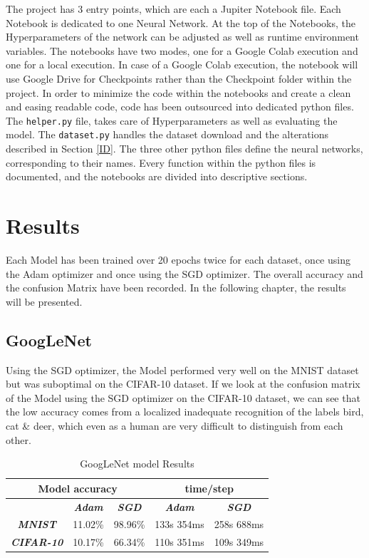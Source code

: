 \documentclass[conference]{IEEEtran}
\begin{document}
The project has 3 entry points, which are each a Jupiter Notebook file. Each Notebook is dedicated to one Neural Network.
At the top of the Notebooks, the Hyperparameters of the network can be adjusted as well as runtime environment variables.
The notebooks have two modes, one for a Google Colab execution and one for a local execution.
In case of a Google Colab execution, the notebook will use Google Drive for Checkpoints rather than the Checkpoint folder within the project.
In order to minimize the code within the notebooks and create a clean and easing readable code, code has been outsourced into dedicated python files.
The \verb|helper.py| file, takes care of Hyperparameters as well as evaluating the model. The \verb|dataset.py| handles the dataset download and the alterations described in Section \ref{ID}.
The three other python files define the neural networks, corresponding to their names. Every function within the python files is documented, and the notebooks are divided into descriptive sections.


\section{Results}
Each Model has been trained over 20 epochs twice for each dataset, once using the Adam optimizer and once using the SGD optimizer. 
The overall accuracy and the confusion Matrix have been recorded. In the following chapter, the results will be presented.

\subsection{GoogLeNet}

Using the SGD optimizer, the Model performed very well on the MNIST dataset but was suboptimal on the CIFAR-10 dataset. 
If we look at the confusion matrix of the Model using the SGD optimizer on the CIFAR-10 dataset, we can see that the low accuracy comes from a localized inadequate recognition of the labels bird, cat \& deer, which even as a human are very difficult to distinguish from each other.

\begin{table}[!htbp]
    \caption{GoogLeNet model Results}
    \begin{center}
    \begin{tabular}{|c|c|c|c|c|}
    \cline{1-5} 
    \multicolumn{3}{|c|}{\textbf{Model accuracy}} & \multicolumn{2}{|c|}{\textbf{time/step}} \\
    \hline 
    \textit{} & \textbf{\textit{Adam}} & \textbf{\textit{SGD}} & \textbf{\textit{Adam}} & \textbf{\textit{SGD}} \\
    \hline
    \textbf{\textit{MNIST}} & 11.02\% & 98.96\% & 133s 354ms & 258s 688ms \\
    \hline
    \textbf{\textit{CIFAR-10}} & 10.17\% & 66.34\% & 110s 351ms & 109s 349ms \\
    \cline{1-5} 
    \end{tabular}
    \label{tab: GoogLeNet model accuracy}
    \end{center}
\end{table}
\end{document}

